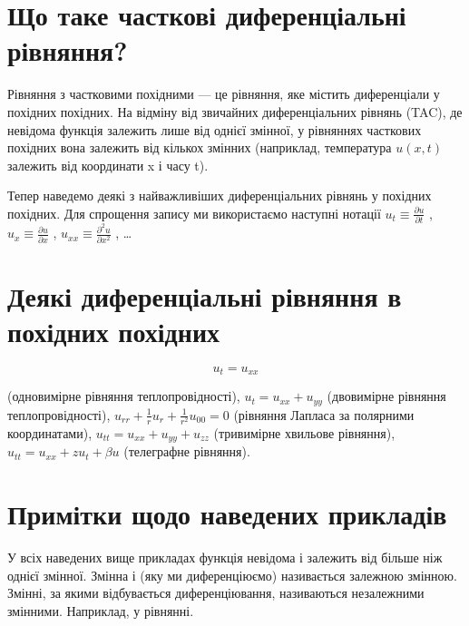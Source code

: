 \documentclass[
  ukrainian,
]{article}
\begin{document}
\section{Що таке часткові диференціальні
рівняння?}\label{ux449ux43e-ux442ux430ux43aux435-ux447ux430ux441ux442ux43aux43eux432ux456-ux434ux438ux444ux435ux440ux435ux43dux446ux456ux430ux43bux44cux43dux456-ux440ux456ux432ux43dux44fux43dux43dux44f}

Рівняння з частковими похідними --- це рівняння, яке містить
диференціали у похідних похідних. На відміну від звичайних
диференціальних рівнянь (TAC), де невідома функція залежить лише від
однієї змінної, у рівняннях часткових похідних вона залежить від кількох
змінних (наприклад, температура \(u(x, t)\) залежить від координати x і
часу t).

Тепер наведемо деякі з найважливіших диференціальних рівнянь у похідних
похідних. Для спрощення запису ми використаємо наступні нотації
\(u_t \equiv \frac{\partial u}{\partial t}\) ,
\(u_x \equiv \frac{\partial u}{\partial x}\) ,
\(u_{xx} \equiv \frac{\partial^2 u}{\partial x^2}\) , \ldots{}

\section{Деякі диференціальні рівняння в похідних
похідних}\label{ux434ux435ux44fux43aux456-ux434ux438ux444ux435ux440ux435ux43dux446ux456ux430ux43bux44cux43dux456-ux440ux456ux432ux43dux44fux43dux43dux44f-ux432-ux43fux43eux445ux456ux434ux43dux438ux445-ux43fux43eux445ux456ux434ux43dux438ux445}

\[
u_t = u_{xx}
\]

(одновимірне рівняння теплопровідності), \(u_t = u_{xx} + u_{yy}\)
(двовимірне рівняння теплопровідності),
\(u_{rr} + \frac{1}{r}u_r + \frac{1}{r^2}u_{00} = 0\) (рівняння Лапласа
за полярними координатами), \(u_{tt} = u_{xx} + u_{yy} + u_{zz}\)
(тривимірне хвильове рівняння), \(u_{tt} = u_{xx} + zu_t + \beta u\)
(телеграфне рівняння).

\section{Примітки щодо наведених
прикладів}\label{ux43fux440ux438ux43cux456ux442ux43aux438-ux449ux43eux434ux43e-ux43dux430ux432ux435ux434ux435ux43dux438ux445-ux43fux440ux438ux43aux43bux430ux434ux456ux432}

У всіх наведених вище прикладах функція невідома і залежить від більше
ніж однієї змінної. Змінна і (яку ми диференціюємо) називається залежною
змінною. Змінні, за якими відбувається диференціювання, називаються
незалежними змінними. Наприклад, у рівнянні.
\end{document}
